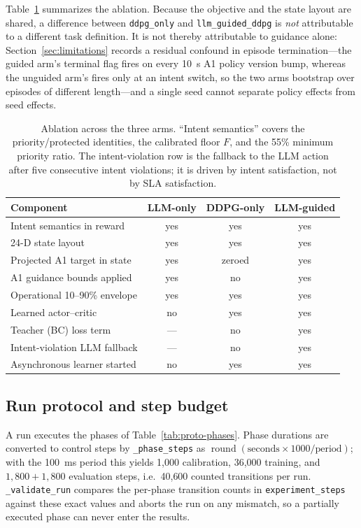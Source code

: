 Table~\ref{tab:proto-arms} summarizes the ablation. Because the objective and the state
layout are shared, a difference between \texttt{ddpg\_only} and \texttt{llm\_guided\_ddpg}
is \emph{not} attributable to a different task definition. It is not thereby attributable to
guidance alone: Section~\ref{sec:limitations} records a residual confound in episode
termination---the guided arm's terminal flag fires on every 10~s A1 policy version bump,
whereas the unguided arm's fires only at an intent switch, so the two arms bootstrap over
episodes of different length---and a single seed cannot separate policy effects from seed
effects.

\begin{table}[t]
\centering
\footnotesize
\setlength{\tabcolsep}{4pt}
\caption{Ablation across the three arms. ``Intent semantics'' covers the priority/protected
identities, the calibrated floor $F$, and the 55\% minimum priority ratio. The
intent-violation row is the fallback to the LLM action after five consecutive intent
violations; it is driven by intent satisfaction, not by SLA satisfaction.}
\label{tab:proto-arms}
\begin{tabular}{lccc}
\toprule
Component & LLM-only & DDPG-only & LLM-guided\\
\midrule
Intent semantics in reward      & yes & yes & yes\\
24-D state layout               & yes & yes & yes\\
Projected A1 target in state    & yes & zeroed & yes\\
A1 guidance bounds applied      & yes & no & yes\\
Operational 10--90\% envelope   & yes & yes & yes\\
Learned actor--critic           & no  & yes & yes\\
Teacher (BC) loss term          & --- & no  & yes\\
Intent-violation LLM fallback   & --- & no  & yes\\
Asynchronous learner started    & no  & yes & yes\\
\bottomrule
\end{tabular}
\end{table}

\subsection{Run protocol and step budget}
A run executes the phases of Table~\ref{tab:proto-phases}. Phase durations are converted to
control steps by \texttt{\_phase\_steps} as
$\operatorname{round}(\text{seconds}\times1000/\text{period})$; with the 100~ms period
this yields 1{,}000 calibration, 36{,}000 training, and $1{,}800+1{,}800$ evaluation steps,
i.e.\ 40{,}600 counted transitions per run. \texttt{\_validate\_run} compares the per-phase
transition counts in \texttt{experiment\_steps} against these exact values and aborts the run
on any mismatch, so a partially executed phase can never enter the results.

